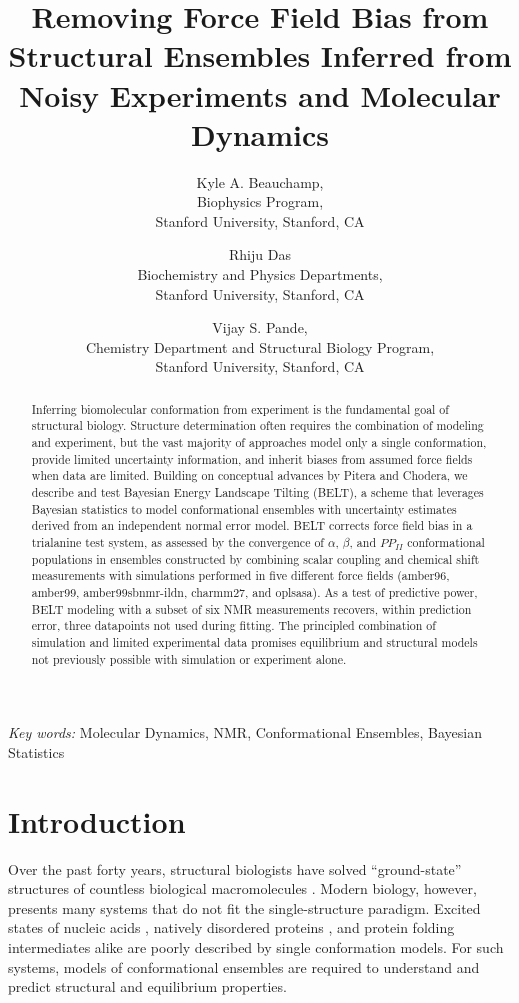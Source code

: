 \documentclass[11pt,titlepage]{article}
\author{Kyle A. Beauchamp, \\
Biophysics Program, \\
Stanford University, Stanford, CA
\and Rhiju Das \\
Biochemistry and Physics Departments, \\
Stanford University, Stanford, CA
\and Vijay S. Pande, \\
Chemistry Department and Structural Biology Program, \\
Stanford University, Stanford, CA
}
\title{Removing Force Field Bias from Structural Ensembles Inferred from Noisy Experiments and Molecular Dynamics}
\begin{document}
\maketitle

\begin{abstract}

Inferring biomolecular conformation from experiment is the fundamental goal of structural biology.  Structure determination often requires the combination of modeling and experiment, but the vast majority of approaches model only a single conformation, provide limited uncertainty information, and inherit biases from assumed force fields when data are limited.  Building on conceptual advances by Pitera and Chodera, we describe and test Bayesian Energy Landscape Tilting (BELT), a scheme that  leverages Bayesian statistics to model conformational ensembles with uncertainty estimates derived from an independent normal error model.  BELT corrects force field bias in a trialanine test system, as assessed by the convergence of $\alpha$, $\beta$, and $PP_{II}$ conformational populations in ensembles constructed by combining scalar coupling and chemical shift measurements with simulations performed in five different force fields (amber96, amber99, amber99sbnmr-ildn, charmm27, and oplsasa).  As a test of predictive power, BELT modeling with a subset of six NMR measurements recovers, within prediction error, three datapoints not used during fitting.  The principled combination of simulation and limited experimental data promises equilibrium and structural models not previously possible with simulation or experiment alone.  

\end{abstract}

\emph{Key words:} Molecular Dynamics, NMR, Conformational Ensembles,  Bayesian Statistics

\section*{Introduction}

Over the past forty years, structural biologists have solved ``ground-state'' structures of countless biological macromolecules \citep{Berman2000}. Modern biology, however, presents many systems that do not fit the single-structure paradigm.  Excited states of nucleic acids \citep{dethoff2012}, natively disordered proteins \citep{fink2005}, and protein folding intermediates \citep{korzhnev2004} alike are poorly described by single conformation models.  For such systems, models of conformational ensembles are required to understand and predict structural and equilibrium properties.  
\end{document}
